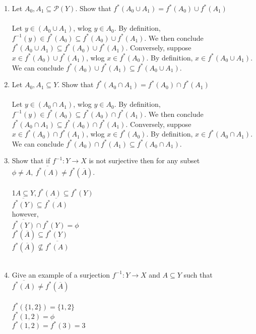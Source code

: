 \documentclass[11pt]{article}
\begin{document}
\begin{enumerate}
\begin{enumerate}
\item Let $A_0 , A_1 \subseteq \mathcal{P}(Y)$. Show that $f^*(A_0 \cup A_1 ) = f^*(A_0) \cup f^*(A_1)$
\\ \\
Let $y \in (A_0 \cup A_1)$, wlog $y \in A_0$.  By definition, $f^{-1}(y) \in f^*(A_0) \subseteq f^*(A_0) \cup f^*(A_1).$  We then conclude $f^*(A_0 \cup A_1) \subseteq f^*(A_0) \cup f^*(A_1)$.  Conversely, suppose $x \in f^*(A_0) \cup f^*(A_1)$, wlog $x \in f^*(A_0)$.  By definition, $x \in f^*(A_0 \cup A_1)$.  We can conclude $f^*(A_0) \cup f^*(A_1) \subseteq f^*(A_0 \cup A_1)$.
\\

\item Let $A_0 , A_1 \subseteq Y$. Show that $f^*(A_0 \cap A_1 ) = f^*(A_0) \cap f^*(A_1)$
\\ \\
Let $y \in (A_0 \cap A_1)$, wlog $y \in A_0$.  By definition, $f^{-1}(y) \in f^*(A_0) \subseteq f^*(A_0) \cap f^*(A_1).$  We then conclude $f^*(A_0 \cap A_1) \subseteq f^*(A_0) \cap f^*(A_1)$.  Conversely, suppose $x \in f^*(A_0) \cap f^*(A_1)$, wlog $x \in f^*(A_0)$.  By definition, $x \in f^*(A_0 \cap A_1)$.  We can conclude $f^*(A_0) \cap f^*(A_1) \subseteq f^*(A_0 \cap A_1)$.
\\


\item Show that if $f^{-1}:Y \to X$ is not surjective then for any subset $\phi \neq A,\   \overline{f^*(A)} \neq f^*(\overline{A})$.\\
\\
1$A \subseteq Y, f^*(A) \subseteq f^*(Y)$\\
$\overline{f^*(Y)} \subseteq \overline{f^*(A)}$\\
however,\\
$\overline{f^*(Y)} \cap f^*(Y) = \phi$\\
$f^*(\overline{A}) \subseteq f^*(Y)$\\
$f^*(\overline{A}) \nsubseteq \overline{f^*(A)}$\\
\\
\item Give an example of a surjection $f^{-1}: Y \to X$ and $A \subseteq Y$ such that $\overline{f^*(A)} \neq f^*(\overline{A})$\\
\\
$f^*(\{1,2\}) = \{1,2\}$\\
$f^*(1,2) = \phi$\\
$f^*(1,2) = f^*(3) = 3$
\end{enumerate} %
\newpage


\end{enumerate}
\end{document}
